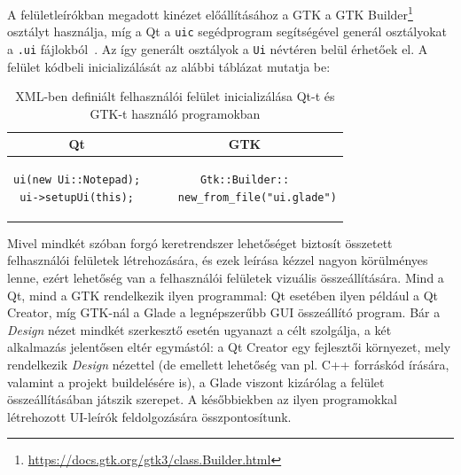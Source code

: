 A felületleírókban megadott kinézet előállításához a GTK a GTK Builder\footnote{\url{https://docs.gtk.org/gtk3/class.Builder.html}} osztályt használja, míg a Qt a \texttt{uic} segédprogram segítségével generál osztályokat a \texttt{.ui} fájlokból~\cite{qtnotepadtutorial}. Az így generált osztályok a \texttt{Ui} névtéren belül érhetőek el. A felület kódbeli inicializálását az alábbi táblázat mutatja be:
\begin{table}[h]
	\centering
	\begin{tabular}{|c|c|}
		\hline
		Qt & GTK \\
		\hline
		\begin{minipage}{0.35\linewidth}
			\begin{lstlisting}
ui(new Ui::Notepad);
ui->setupUi(this);
			\end{lstlisting}
		\end{minipage}
		&
		\begin{minipage}{0.35\linewidth}
			\begin{lstlisting}
Gtk::Builder::
    new_from_file("ui.glade")
			\end{lstlisting}
		\end{minipage} \\
		\hline
	\end{tabular}
	\label{tab:qtgtkxmlbuild}
	\caption{XML-ben definiált felhasználói felület inicializálása Qt-t és GTK-t használó programokban}
\end{table}

Mivel mindkét szóban forgó keretrendszer lehetőséget biztosít összetett felhasználói felületek létrehozására, és ezek leírása kézzel nagyon körülményes lenne, ezért lehetőség van a felhasználói felületek vizuális összeállítására. Mind a Qt, mind a GTK rendelkezik ilyen programmal: Qt esetében ilyen például a Qt Creator, míg GTK-nál a Glade a legnépszerűbb GUI összeállító program. Bár a \textit{Design} nézet mindkét szerkesztő esetén ugyanazt a célt szolgálja, a két alkalmazás jelentősen eltér egymástól: a Qt Creator egy fejlesztői környezet, mely rendelkezik \textit{Design} nézettel (de emellett lehetőség van pl. C++ forráskód írására, valamint a projekt buildelésére is), a Glade viszont kizárólag a felület összeállításában játszik szerepet. A későbbiekben az ilyen programokkal létrehozott UI-leírók feldolgozására összpontosítunk.

{
}

